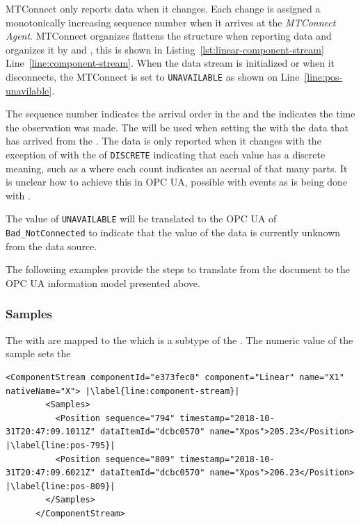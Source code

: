 MTConnect only reports data when it changes. Each change is assigned a monotonically increasing sequence number when it arrives at the \textit{MTConnect Agent}. MTConnect organizes flattens the structure when reporting data and organizes it by  and , this is shown in  Listing~\ref{lst:linear-component-stream} Line~\ref{line:component-stream}. When the data stream is initialized or when it disconnects, the MTConnect  is set to \texttt{UNAVAILABLE} as shown on Line~\ref{line:pos-unavilable}.

The sequence number indicates the arrival order in the  and the  indicates the time the observation was made. The  will be used when setting the  with the data that has arrived from the . The data is only reported when it changes with the exception of  with the  of \texttt{DISCRETE} indicating that each value has a discrete meaning, such as a  where each count indicates an accrual of that many parts. {\color{red} It is unclear how to achieve this in OPC UA, possible with events as is being done with }.

The value of \texttt{UNAVAILABLE} will be translated to the OPC UA   of \texttt{Bad_NotConnected} to indicate that the value of the data is currently unknown from the data source. 

The followiing examples provide the steps to translate from the  document to the OPC UA information model presented above.

\subsubsection{Samples}

The  with   are mapped to the  which is a subtype of the  . The numeric value of the sample sets the  

\begin{lstlisting}[firstnumber=last,escapechar=|,%
    caption={Linear Component Stream},label={lst:linear-component-stream}]
      <ComponentStream componentId="e373fec0" component="Linear" name="X1" nativeName="X"> |\label{line:component-stream}|
        <Samples>
          <Position sequence="794" timestamp="2018-10-31T20:47:09.1011Z" dataItemId="dcbc0570" name="Xpos">205.23</Position> |\label{line:pos-795}|
          <Position sequence="809" timestamp="2018-10-31T20:47:09.6021Z" dataItemId="dcbc0570" name="Xpos">206.23</Position> |\label{line:pos-809}|
        </Samples>
      </ComponentStream>
\end{lstlisting}

